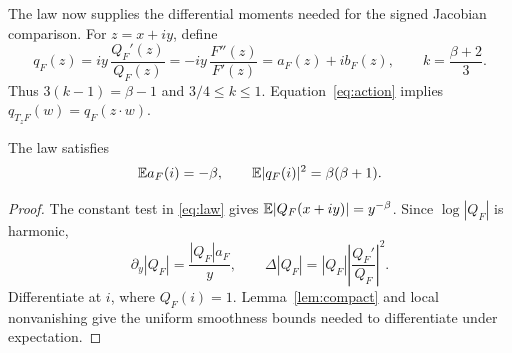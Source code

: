 The law now supplies the differential moments needed for the signed
Jacobian comparison. For \(z=x+iy\), define
\begin{equation}\label{eq:qk}
 q_F(z)=iy\,\frac{Q_F'(z)}{Q_F(z)}
       =-iy\,\frac{F''(z)}{F'(z)}=a_F(z)+ib_F(z),
 \qquad k=\frac{\beta+2}{3}.
\end{equation}
Thus \(3(k-1)=\beta-1\) and \(3/4\le k\le1\).
Equation~\eqref{eq:action} implies
\(q_{T_zF}(w)=q_F(z\cdot w)\).

\begin{lemma}\label{lem:moments}
The law satisfies
\begin{equation}\label{eq:moments}
 \mathbb E a_F(i)=-\beta,\qquad
 \mathbb E|q_F(i)|^2=\beta(\beta+1).
\end{equation}
\end{lemma}
\begin{proof}
The constant test in \eqref{eq:law} gives
\(\mathbb E|Q_F(x+iy)|=y^{-\beta}\).
Since \(\log|Q_F|\) is harmonic,
\[
 \partial_y|Q_F|=\frac{|Q_F|a_F}{y},\qquad
 \Delta|Q_F|=|Q_F|\left|\frac{Q_F'}{Q_F}\right|^2.
\]
Differentiate at \(i\), where \(Q_F(i)=1\).
Lemma~\ref{lem:compact} and local nonvanishing give the uniform
smoothness bounds needed to differentiate under expectation.
\end{proof}
